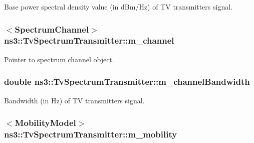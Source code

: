 Base power spectral density value (in d\+Bm/\+Hz) of TV transmitter\textquotesingle{}s signal. 

\subsubsection[{\texorpdfstring{m\+\_\+channel}{m_channel}}]{$<${\bf Spectrum\+Channel}$>$ ns3\+::\+Tv\+Spectrum\+Transmitter\+::m\+\_\+channel\hspace{0.3cm}{\ttfamily [private]}}\hypertarget{classns3_1_1TvSpectrumTransmitter_ac432cb6c1d80ec4ce00b5ce3589ef1d5}{}\label{classns3_1_1TvSpectrumTransmitter_ac432cb6c1d80ec4ce00b5ce3589ef1d5}


Pointer to spectrum channel object. 

\subsubsection[{\texorpdfstring{m\+\_\+channel\+Bandwidth}{m_channelBandwidth}}]{\setlength{\rightskip}{0pt plus 5cm}double ns3\+::\+Tv\+Spectrum\+Transmitter\+::m\+\_\+channel\+Bandwidth\hspace{0.3cm}{\ttfamily [private]}}\hypertarget{classns3_1_1TvSpectrumTransmitter_a6e9866a446454a46b3a64be122931c95}{}\label{classns3_1_1TvSpectrumTransmitter_a6e9866a446454a46b3a64be122931c95}


Bandwidth (in Hz) of TV transmitter\textquotesingle{}s signal. 

\subsubsection[{\texorpdfstring{m\+\_\+mobility}{m_mobility}}]{$<${\bf Mobility\+Model}$>$ ns3\+::\+Tv\+Spectrum\+Transmitter\+::m\+\_\+mobility\hspace{0.3cm}{\ttfamily [private]}}\hypertarget{classns3_1_1TvSpectrumTransmitter_af43f03a30cf9a63b2af888334a4856b6}{}\label{classns3_1_1TvSpectrumTransmitter_af43f03a30cf9a63b2af888334a4856b6}


